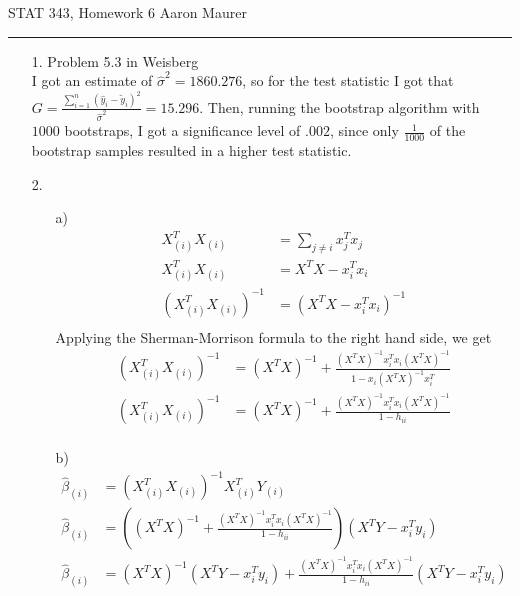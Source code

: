 \documentclass[11pt]{article}
\theoremstyle{definition}
\begin{document}
STAT 343, Homework 6 \hfill Aaron Maurer
\vspace{2mm}
\hrule
\vspace{2mm}
\begin{itemize}
    \item[1.] Problem 5.3 in Weisberg \\
        I got an estimate of \(\hat\sigma^2=1860.276\), so for the test statistic I got that \(G=\frac{\sum_{i=1}^n(\hat y_i - \tilde y_i)^2}{\hat\sigma^2}=15.296\). Then, running the bootstrap algorithm with $1000$ bootstraps, I got a significance level of  $.002$, since only $\frac{1}{1000}$ of the bootstrap samples resulted in a higher test statistic.
    \item[2.]
        \begin{itemize}
            \item[a)]
                \begin{align*}
                    X_{(i)}^TX_{(i)}&=\sum_{j\neq i} x_j^Tx_j \\
                    X_{(i)}^TX_{(i)}&= X^TX - x_i^Tx_i \\
                    (X_{(i)}^TX_{(i)})^{-1}&= (X^TX - x_i^Tx_i)^{-1} \\
                \end{align*}
                Applying the Sherman-Morrison formula to the right hand side, we get
                \begin{align*}
                    (X_{(i)}^TX_{(i)})^{-1}&= (X^TX)^{-1} + \frac{(X^TX)^{-1}x_i^Tx_i(X^TX)^{-1}}{1-x_i(X^TX)^{-1}x_i^T} \\
                    (X_{(i)}^TX_{(i)})^{-1}&= (X^TX)^{-1} + \frac{(X^TX)^{-1}x_i^Tx_i(X^TX)^{-1}}{1-h_{ii}} \\
                \end{align*}
            \item[b)]
                \begin{align*}
                    \hat \beta_{(i)} &= (X_{(i)}^TX_{(i)})^{-1}X_{(i)}^T Y_{(i)}   \\
                    \hat \beta_{(i)} &= \left((X^TX)^{-1} + \frac{(X^TX)^{-1}x_i^Tx_i(X^TX)^{-1}}{1-h_{ii}} \right)\left(X^TY - x_i^Ty_i\right)  \\
                    \hat \beta_{(i)} &= (X^TX)^{-1}\left(X^TY - x_i^Ty_i\right) + \frac{(X^TX)^{-1}x_i^Tx_i(X^TX)^{-1}}{1-h_{ii}}\left(X^TY - x_i^T y_i\right)   \\

\end{align*}
\end{itemize}
\end{itemize}
\end{document}
